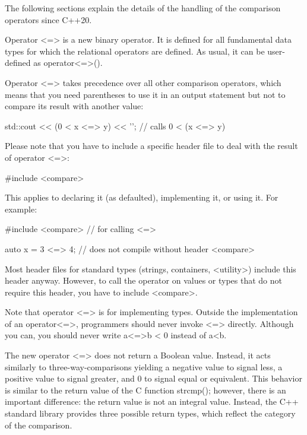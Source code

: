 The following sections explain the details of the handling of the comparison operators since C++20.


Operator <=> is a new binary operator. It is defined for all fundamental data types for which the relational operators are defined. As usual, it can be user-defined as operator<=>().

Operator <=> takes precedence over all other comparison operators, which means that you need parentheses to use it in an output statement but not to compare its result with another value:

\begin{cpp}
std::cout << (0 < x <=> y) << '\n'; // calls 0 < (x <=> y)
\end{cpp}

Please note that you have to include a specific header file to deal with the result of operator <=>:

\begin{cpp}
#include <compare>
\end{cpp}

This applies to declaring it (as defaulted), implementing it, or using it. For example:

\begin{cpp}
#include <compare> // for calling <=>

auto x = 3 <=> 4; // does not compile without header <compare>
\end{cpp}

Most header files for standard types (strings, containers, <utility>) include this header anyway. However, to call the operator on values or types that do not require this header, you have to include <compare>.

Note that operator <=> is for implementing types. Outside the implementation of an operator<=>, programmers should never invoke <=> directly. Although you can, you should never write a<=>b < 0 instead of a<b.


The new operator <=> does not return a Boolean value. Instead, it acts similarly to three-way-comparisons yielding a negative value to signal less, a positive value to signal greater, and 0 to signal equal or equivalent. This behavior is similar to the return value of the C function strcmp(); however, there is an important difference: the return value is not an integral value. Instead, the C++ standard library provides three possible return types, which reflect the category of the comparison.

